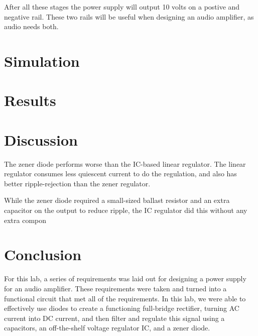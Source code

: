 \documentclass[12pt]{article}
\begin{document}
After all these stages the power supply will output 10 volts on a postive and negative rail. These two rails will be useful when designing an audio amplifier, as audio needs both.

\section{Simulation}

\section{Results}


\section{Discussion}


The zener diode performs worse than the IC-based linear regulator. The linear regulator consumes less quiescent current to do the regulation,
and also has better ripple-rejection than the zener regulator.

While the zener diode required a small-sized ballast resistor and an extra capacitor on the output to reduce ripple,
the IC regulator did this without any extra compon

\section{Conclusion}

For this lab, a series of requirements was laid out for designing a power supply for an audio
amplifier. These requirements were taken and turned into a functional circuit that met
all of the requirements. In this lab, we were able to effectively use diodes to create
a functioning full-bridge rectifier, turning AC current into DC current, and then filter
and regulate this signal using a capacitors, an off-the-shelf voltage regulator IC, and
a zener diode.
\end{document}
